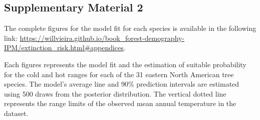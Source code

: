 \newpage

\hypertarget{supplementary-material-2}{%
\subsection{Supplementary Material 2}\label{supplementary-material-2}}

The complete figures for the model fit for each species is available in
the following link:
\url{https://willvieira.github.io/book_forest-demography-IPM/extinction_risk.html\#appendices}.

Each figures represents the model fit and the estimation of suitable
probability for the cold and hot ranges for each of the 31 eastern North
American tree species. The model's average line and 90\% prediction
intervals are estimated using 500 draws from the posterior distribution.
The vertical dotted line represents the range limits of the observed
mean annual temperature in the dataset.

\newpage

